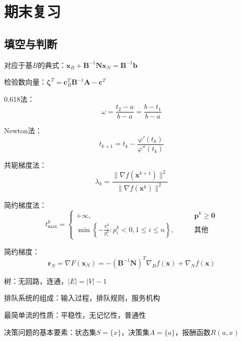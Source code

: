 \documentclass[lang = cn, scheme = chinese, thmcnt = section]{elegantbook}
\newcommand{\bs}{\boldsymbol}          %
\begin{document}
\appendix

\chapter{期末复习}

\section{填空与判断}

对应于基$B$的典式：$\bs{x}_B+\bs{B}^{-1}\bs{Nx}_N=\bs{B}^{-1}\bs{b}$

检验数向量：$\bs{\zeta}^T=\bs{c}_B^T\bs{B}^{-1}\bs{A}-\bs{c}^T$

0.618法：%
$$
\omega=\frac{t_2-a}{b-a}=\frac{b-t_1}{b-a}
$$

Newton法：%
$$
t_{k+1}=t_k-\frac{\varphi'(t_k)}{\varphi''(t_k)}
$$

共轭梯度法：%
$$
\lambda_k=\frac{\| \nabla f(\bs{x}^{k+1}) \|^2}{\| \nabla f(\bs{x}^{k}) \|^2}
$$

简约梯度法：
$$
t_{\text{max}}^k=\begin{cases}
	+\infty,\qquad & \bs{p}^k\ge \bs{0}\\
	\min\left\{ -\frac{x_i^k}{p_i^k}:p_i^k<0,1\le i \le n \right\},\qquad & \text{其他}
\end{cases}
$$

简约梯度：%
$$
\bs{r}_N=\nabla F(\bs{x}_N)
=-(\bs{B}^{-1}\bs{N})^T\nabla_Bf(\bs{x})+\nabla_Nf(\bs{x})
$$

树：无回路，连通，$|E|=|V|-1$

排队系统的组成：输入过程，排队规则，服务机构

最简单流的性质：平稳性，无记忆性，普通性

决策问题的基本要素：状态集$S=\{ x \}$，决策集$A=\{ a \}$，报酬函数$R(a,x)$
\end{document}
